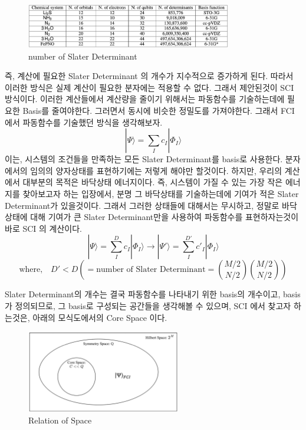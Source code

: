\documentclass[10pt]{article}
\begin{document}
\begin{figure}[htbp]
  \centering
  \includegraphics[width=0.8\textwidth]{fig/numofdet.png}
  \caption{number of Slater Determinant}
  \label{fig:example2}
\end{figure}
즉, 계산에 필요한 Slater Determinant 의 개수가 지수적으로 증가하게 된다. 따라서 이러한 방식은 실제 계산이 필요한 분자에는 적용할 수 없다. 그래서 제안된것이 SCI 방식이다.
이러한 계산들에서 계산량을 줄이기 위해서는 파동함수를 기술하는데에 필요한 Basis를 줄여야한다. 그러면서 동시에 비슷한 정밀도를 가져야한다. 
그래서 FCI 에서 파동함수를 기술했던 방식을 생각해보자. 
\[
|\Psi\rangle = \sum_I c_I |\Phi_I\rangle
\]
이는, 시스템의 조건들을 만족하는 모든 Slater Determinant를 basis로 사용한다. 분자에서의 임의의 양자상태를 표현하기에는 저렇게 해야만 할것이다. 
하지만, 우리의 계산에서 대부분의 목적은 바닥상태 에너지이다. 즉, 시스템이 가질 수 있는 가장 작은 에너지를 찾아보고자 하는 입장에서, 분명 그 바닥상태를 기술하는데에 기여가 적은 Slater Determinant가 있을것이다. 
그래서 그러한 상태들에 대해서는 무시하고, 정말로 바닥상태에 대해 기여가 큰 Slater Determinant만을 사용하여 파동함수를 표현하자는것이 바로 SCI 의 계산이다. 
\[
|\Psi\rangle = \sum_{I}^{D} c_I |\Phi_I\rangle \longrightarrow  |\Psi'\rangle = \sum_{I}^{D'} c'_I |\Phi_I\rangle 
\]
\[
\text{where,} \quad D' < D \left(= \text{number of Slater Determinant} = \binom{M/2}{N/2}\binom{M/2}{N/2}\right)
\]

Slater Determinant의 개수는 결국 파동함수를 나타내기 위한 basis의 개수이고, basis가 정의되므로, 그 basis로 구성되는 공간들을 생각해볼 수 있으며, SCI 에서 찾고자 하는것은, 아래의 모식도에서의 Core Space 이다. 

\begin{figure}[htbp]
  \centering
  \includegraphics[width=0.6\textwidth]{fig/space.png}
  \caption{Relation of Space}
  \label{fig:example2}
\end{figure}
\end{document}
